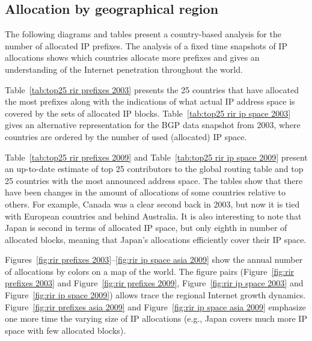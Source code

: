 \subsection{Allocation by geographical region}
The following diagrams and tables present a country-based analysis for the number of allocated IP prefixes. The analysis of a fixed time snapshots of IP allocations shows which countries allocate more prefixes and gives an understanding of the Internet penetration throughout the world.

Table~\ref{tab:top25 rir prefixes 2003} presents the 25 countries that have allocated the most prefixes along with the indications of what actual IP address
space is covered by the sets of allocated IP blocks. Table~\ref{tab:top25 rir
ip space 2003} gives an alternative representation for the BGP data snapshot
from 2003, where countries are ordered by the number of used (allocated) IP
space. 

Table~\ref{tab:top25 rir prefixes 2009} and Table~\ref{tab:top25 rir ip space
2009} present an up-to-date estimate of top 25 contributors to the global
routing table and top 25 countries with the most announced address space. The tables show that there have been changes in the amount of allocations of some countries relative to others. For example, Canada was a clear second back in 2003, but now it is tied with European countries and behind Australia. It is also interesting to note that Japan is second in terms of allocated IP space, but only eighth in number of allocated blocks, meaning that Japan's allocations efficiently cover their IP space.

Figures~\ref{fig:rir prefixes 2003}--\ref{fig:rir ip space asia 2009} show the annual number of allocations by colors on a map of the world. The figure pairs (Figure~\ref{fig:rir prefixes 2003} and Figure~\ref{fig:rir prefixes 2009},
Figure~\ref{fig:rir ip space 2003} and Figure~\ref{fig:rir ip space 2009})
allows trace the regional Internet growth dynamics. Figure~\ref{fig:rir
prefixes asia 2009} and Figure~\ref{fig:rir ip space asia 2009} 
emphasize one more time the varying size of IP allocations 
(e.g., Japan covers much more IP space with few allocated blocks).





